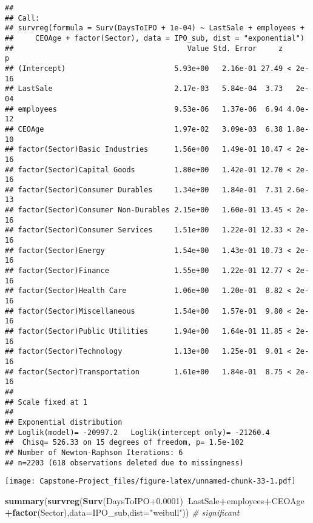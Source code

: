 \documentclass[]{article}
\newenvironment{Shaded}{\begin{snugshade}}{\end{snugshade}}
\newcommand{\CommentTok}[1]{\textcolor[rgb]{0.56,0.35,0.01}{\textit{#1}}}
\newcommand{\DataTypeTok}[1]{\textcolor[rgb]{0.13,0.29,0.53}{#1}}
\newcommand{\FloatTok}[1]{\textcolor[rgb]{0.00,0.00,0.81}{#1}}
\newcommand{\KeywordTok}[1]{\textcolor[rgb]{0.13,0.29,0.53}{\textbf{#1}}}
\newcommand{\NormalTok}[1]{#1}
\newcommand{\OperatorTok}[1]{\textcolor[rgb]{0.81,0.36,0.00}{\textbf{#1}}}
\newcommand{\StringTok}[1]{\textcolor[rgb]{0.31,0.60,0.02}{#1}}
\begin{document}
\begin{verbatim}
## 
## Call:
## survreg(formula = Surv(DaysToIPO + 1e-04) ~ LastSale + employees + 
##     CEOAge + factor(Sector), data = IPO_sub, dist = "exponential")
##                                        Value Std. Error     z       p
## (Intercept)                         5.93e+00   2.16e-01 27.49 < 2e-16
## LastSale                            2.17e-03   5.84e-04  3.73   2e-04
## employees                           9.53e-06   1.37e-06  6.94 4.0e-12
## CEOAge                              1.97e-02   3.09e-03  6.38 1.8e-10
## factor(Sector)Basic Industries      1.56e+00   1.49e-01 10.47 < 2e-16
## factor(Sector)Capital Goods         1.80e+00   1.42e-01 12.70 < 2e-16
## factor(Sector)Consumer Durables     1.34e+00   1.84e-01  7.31 2.6e-13
## factor(Sector)Consumer Non-Durables 2.15e+00   1.60e-01 13.45 < 2e-16
## factor(Sector)Consumer Services     1.51e+00   1.22e-01 12.33 < 2e-16
## factor(Sector)Energy                1.54e+00   1.43e-01 10.73 < 2e-16
## factor(Sector)Finance               1.55e+00   1.22e-01 12.77 < 2e-16
## factor(Sector)Health Care           1.06e+00   1.20e-01  8.82 < 2e-16
## factor(Sector)Miscellaneous         1.54e+00   1.57e-01  9.80 < 2e-16
## factor(Sector)Public Utilities      1.94e+00   1.64e-01 11.85 < 2e-16
## factor(Sector)Technology            1.13e+00   1.25e-01  9.01 < 2e-16
## factor(Sector)Transportation        1.61e+00   1.84e-01  8.75 < 2e-16
## 
## Scale fixed at 1 
## 
## Exponential distribution
## Loglik(model)= -20997.2   Loglik(intercept only)= -21260.4
##  Chisq= 526.33 on 15 degrees of freedom, p= 1.5e-102 
## Number of Newton-Raphson Iterations: 6 
## n=2203 (618 observations deleted due to missingness)
\end{verbatim}

\texttt{[image: Capstone-Project\_files/figure-latex/unnamed-chunk-33-1.pdf]}

\begin{Shaded}
\begin{Highlighting}[]
\KeywordTok{summary}\NormalTok{(}\KeywordTok{survreg}\NormalTok{(}\KeywordTok{Surv}\NormalTok{(DaysToIPO}\FloatTok{+0.0001}\NormalTok{)}\OperatorTok{~}\NormalTok{LastSale}\OperatorTok{+}\NormalTok{employees}\OperatorTok{+}\NormalTok{CEOAge}\OperatorTok{+}\KeywordTok{factor}\NormalTok{(Sector),}\DataTypeTok{data=}\NormalTok{IPO_sub,}\DataTypeTok{dist=}\StringTok{"weibull"}\NormalTok{)) }\CommentTok{# significant}
\end{Highlighting}
\end{Shaded}
\end{document}
